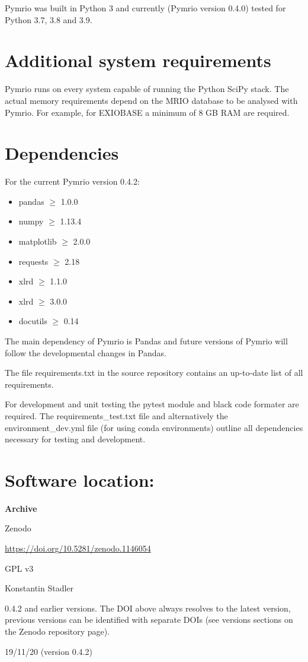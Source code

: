 \documentclass{jors}
\begin{document}
Pymrio was built in Python 3 and currently (Pymrio version 0.4.0) tested for Python 3.7, 3.8 and 3.9.


\section*{Additional system requirements}

Pymrio runs on every system capable of running the Python SciPy stack.
The actual memory requirements depend on the MRIO database to be analysed with Pymrio. For example, for EXIOBASE \cite{stadler2018_EXIOBASE} a minimum of 8 GB RAM are required. 

\section*{Dependencies}

For the current Pymrio version 0.4.2:

\begin{itemize}
    \item pandas $\ge$ 1.0.0
    \item numpy $\ge$ 1.13.4
    \item matplotlib $\ge$ 2.0.0
    \item requests $\ge$ 2.18
    \item xlrd $\ge$ 1.1.0 
     \item xlrd $\ge$ 3.0.0
    \item docutils $\ge$ 0.14 
\end{itemize}

The main dependency of Pymrio is Pandas and future versions of Pymrio will follow the developmental changes in Pandas.

The file requirements.txt in the source repository contains an up-to-date list of all requirements.

For development and unit testing the pytest module and black code formater are required. The requirements\_test.txt file and alternatively the environment\_dev.yml file (for using conda environments) outline all dependencies necessary for testing and development.

\section*{Software location:}

{\bf Archive} 

\begin{description}[noitemsep,topsep=0pt]
	\item[Name:] Zenodo
    \item[Persistent identifier:] \url{https://doi.org/10.5281/zenodo.1146054}
	\item[Licence:] GPL v3
	\item[Publisher:]  Konstantin Stadler
    \item[Version published:] 0.4.2 and earlier versions. The DOI above always resolves to the latest version, previous versions can be identified with separate DOIs (see versions sections on the Zenodo repository page). 
    \item[Date published:] 19/11/20 (version 0.4.2)
\end{description}
\end{document}
